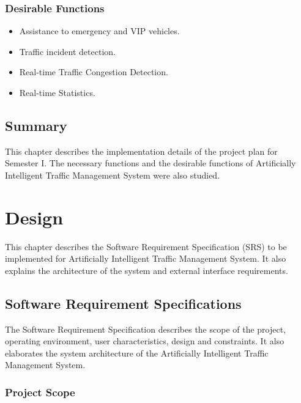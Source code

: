 \documentclass[openany,12pt]{report}
\begin{document}
	\subsection{Desirable  Functions}
	\begin{itemize}
		\item{Assistance to emergency and VIP vehicles.}	
		\item{Traffic incident detection.}
		\\
		\item{Real-time Traffic Congestion Detection.}
		\item{Real-time Statistics.}
		
	\end{itemize}
	
	\section{Summary}
	\hspace*{0.5in}This chapter describes the implementation details of the project plan for Semester I. The necessary functions and the desirable functions of Artificially Intelligent Traffic Management System were also studied.
	\chapter{Design}
	\hspace*{0.5in}This chapter describes the Software Requirement Specification (SRS) to be implemented for Artificially Intelligent Traffic Management System. It also explains the architecture of the system and external interface requirements.\\
	
	\section{Software Requirement Specifications}
	\hspace*{0.5in} The Software Requirement Specification describes the scope of the project, operating environment, user characteristics, design and constraints. It also elaborates the system architecture of the Artificially Intelligent Traffic Management System.
	
	\subsection{Project Scope}
	
\end{document}
